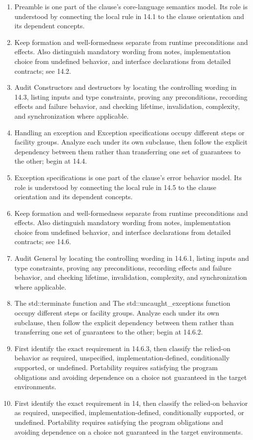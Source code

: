 \documentclass[11pt,letterpaper]{article}
\begin{document}
\begin{enumerate}
\item Preamble is one part of the clause's core-language semantics model. Its role is understood by connecting the local rule in 14.1 to the clause orientation and its dependent concepts.
\item Keep formation and well-formedness separate from runtime preconditions and effects. Also distinguish mandatory wording from notes, implementation choice from undefined behavior, and interface declarations from detailed contracts; see 14.2.
\item Audit Constructors and destructors by locating the controlling wording in 14.3, listing inputs and type constraints, proving any preconditions, recording effects and failure behavior, and checking lifetime, invalidation, complexity, and synchronization where applicable.
\item Handling an exception and Exception specifications occupy different steps or facility groups. Analyze each under its own subclause, then follow the explicit dependency between them rather than transferring one set of guarantees to the other; begin at 14.4.
\item Exception specifications is one part of the clause's error behavior model. Its role is understood by connecting the local rule in 14.5 to the clause orientation and its dependent concepts.
\item Keep formation and well-formedness separate from runtime preconditions and effects. Also distinguish mandatory wording from notes, implementation choice from undefined behavior, and interface declarations from detailed contracts; see 14.6.
\item Audit General by locating the controlling wording in 14.6.1, listing inputs and type constraints, proving any preconditions, recording effects and failure behavior, and checking lifetime, invalidation, complexity, and synchronization where applicable.
\item The std::terminate function and The std::uncaught\_\allowbreak{}exceptions function occupy different steps or facility groups. Analyze each under its own subclause, then follow the explicit dependency between them rather than transferring one set of guarantees to the other; begin at 14.6.2.
\item First identify the exact requirement in 14.6.3, then classify the relied-on behavior as required, unspecified, implementation-defined, conditionally supported, or undefined. Portability requires satisfying the program obligations and avoiding dependence on a choice not guaranteed in the target environments.
\item First identify the exact requirement in 14, then classify the relied-on behavior as required, unspecified, implementation-defined, conditionally supported, or undefined. Portability requires satisfying the program obligations and avoiding dependence on a choice not guaranteed in the target environments.
\end{enumerate}
\end{document}
